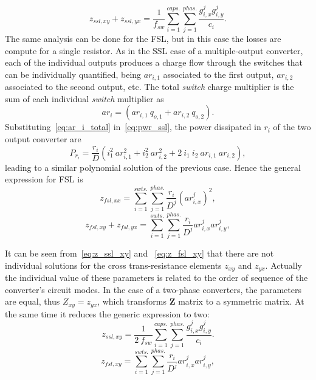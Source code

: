 \begin{equation}
  z_{ssl,xy} + z_{ssl,yx} =  \frac{1}{f_{sw}} \sum_{i=1}^{caps.} \sum_{j=1}^{phas.}
  \frac{g_{i,x}^j g_{i,y}^j}{c_i}.
 \label{eq:z_ssl_xy}
\end{equation}
The same analysis can be done for the FSL, but in this case the losses are compute for a single resistor.
As in the SSL case of a multiple-output converter, each of the individual outputs produces a charge flow through the switches that can be individually quantified, being $ar_{i,1}$ associated to the first output, $ar_{i,2}$ associated to the second output, etc. The total \emph{switch} charge multiplier is the sum of each individual \emph{switch} multiplier as
\begin{equation}
 ar_i =  (ar_{i,1} ~ q_{o,1} +  ar_{i,2} ~ q_{o,2}).
 \label{eq:ar_i_total}
\end{equation}
Substituting~\eqref{eq:ar_i_total} in~\eqref{eq:pwr_ssl}, the power dissipated in $r_i$ of the two output converter are
\begin{equation}
 P_{r_{i}} =  \frac{r_i}{D} (i_1^2 ~ar_{i,1}^2  +  i_2^2 ~ ar_{i,2}^2 + 2 ~ i_{1} ~ i_{2} ~ ar_{i,1}~ar_{i,2}),
 \label{eq:ploss_r_1}
\end{equation}
leading to a similar polynomial solution of the previous case. Hence the general expression for FSL is
\begin{equation}
  z_{fsl,xx} =   \sum_{i=1}^{swts.} \sum_{j=1}^{phas.}
  \frac{r_{i}}{D^j} \left ( ar_{i,x}^j \right )^2,
 \label{eq:z_fsl_xx}
\end{equation}
\begin{equation}
  z_{fsl,xy} + z_{fsl,yx} =   \sum_{i=1}^{swts.} \sum_{j=1}^{phas.}
  \frac{r_{i}}{D^j} ar_{i,x}^j ar_{i,y}^j,
 \label{eq:z_fsl_xy}
\end{equation}

It can be seen from~\eqref{eq:z_ssl_xy} and ~\eqref{eq:z_fsl_xy} that there are not individual solutions for the cross trans-resistance elements $z_{xy}$ and $z_{yx}$. Actually the individual value of these parameters is related to the order of sequence of the converter's circuit modes. In the case of a two-phase converters, the parameters are equal, thus $Z_{xy} = z_{yx}$,  which transforms $\mathbf{Z}$ matrix to a symmetric matrix. At the same time it reduces the generic expression to two:
\begin{equation}
  z_{ssl,xy}  =  \frac{1}{2~f_{sw}} \sum_{i=1}^{caps.} \sum_{j=1}^{phas.}
  \frac{g_{i,x}^j g_{i,y}^j}{c_i}.
 \label{eq:z_ssl_xy_2ph}
\end{equation}
\begin{equation}
  z_{fsl,xy} =   \sum_{i=1}^{swts.} \sum_{j=1}^{phas.}
  \frac{r_{i}}{D^j} ar_{i,x}^j ar_{i,y}^j,
 \label{eq:z_fsl_xy_2ph}
\end{equation}


